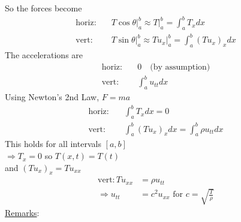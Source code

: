 \documentclass[12pt, letterpaper]{article}
\begin{document}
So the forces become
\begin{align*}
    \text{horiz}: \quad &T\cos\theta\big\vert^b_a \approx T \big\vert^b_a = \int_{a}^{b}T_xdx \\
    \text{vert}: \quad &T\sin\theta\big|^b_a \approx Tu_x \big|^b_a = \int_{a}^{b}(Tu_x)_xdx
\end{align*}
The accelerations are
\begin{align*}
    \text{horiz}: \quad &0 \quad \text{(by assumption)} \\
    \text{vert}: \quad &\int_{a}^{b}u_{tt}dx
\end{align*} 
Using Newton's 2nd Law, $F = ma$
\begin{align*}
    \text{horiz}: \quad &\int_{a}^{b} T_xdx = 0 \\
    \text{vert}: \quad & \int_{a}^{b} (Tu_x)_xdx = \int_a^b \rho u_{tt}dx
\end{align*}
This holds for all intervals $[a,b]$  \\
$\Rightarrow T_x = 0$ so $T(x,t) = T(t)$ \\ 
and $(Tu_x)_x = Tu_{xx}$
\begin{align*}
    \text{vert}: Tu_{xx} &= \rho u_{tt} \\
    \Rightarrow u_{tt} &= c^2u_{xx} \text{ for } c = \sqrt{\frac T\rho}
\end{align*}
\underline{Remarks}:
\end{document}
